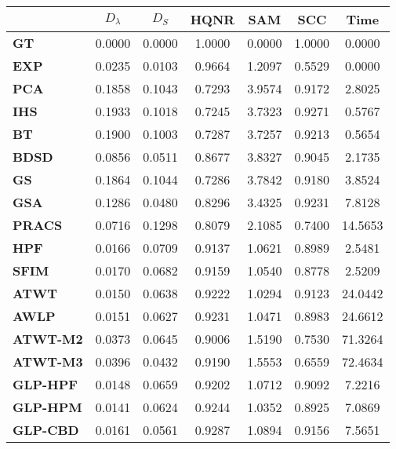 \begin{tabular}{|l|c|c|c|c|c|c|}
\hline
&\textbf{$D_{\lambda}$}&\textbf{$D_{S}$}&\textbf{HQNR}&\textbf{SAM}&\textbf{SCC}&\textbf{Time}\\\hline
\textbf{GT}&0.0000&0.0000&1.0000&0.0000&1.0000&0.0000\\\hline
\textbf{EXP}&0.0235&0.0103&0.9664&1.2097&0.5529&0.0000\\\hline
\textbf{PCA}&0.1858&0.1043&0.7293&3.9574&0.9172&2.8025\\\hline
\textbf{IHS}&0.1933&0.1018&0.7245&3.7323&0.9271&0.5767\\\hline
\textbf{BT}&0.1900&0.1003&0.7287&3.7257&0.9213&0.5654\\\hline
\textbf{BDSD}&0.0856&0.0511&0.8677&3.8327&0.9045&2.1735\\\hline
\textbf{GS}&0.1864&0.1044&0.7286&3.7842&0.9180&3.8524\\\hline
\textbf{GSA}&0.1286&0.0480&0.8296&3.4325&0.9231&7.8128\\\hline
\textbf{PRACS}&0.0716&0.1298&0.8079&2.1085&0.7400&14.5653\\\hline
\textbf{HPF}&0.0166&0.0709&0.9137&1.0621&0.8989&2.5481\\\hline
\textbf{SFIM}&0.0170&0.0682&0.9159&1.0540&0.8778&2.5209\\\hline
\textbf{ATWT}&0.0150&0.0638&0.9222&1.0294&0.9123&24.0442\\\hline
\textbf{AWLP}&0.0151&0.0627&0.9231&1.0471&0.8983&24.6612\\\hline
\textbf{ATWT-M2}&0.0373&0.0645&0.9006&1.5190&0.7530&71.3264\\\hline
\textbf{ATWT-M3}&0.0396&0.0432&0.9190&1.5553&0.6559&72.4634\\\hline
\textbf{GLP-HPF}&0.0148&0.0659&0.9202&1.0712&0.9092&7.2216\\\hline
\textbf{GLP-HPM}&0.0141&0.0624&0.9244&1.0352&0.8925&7.0869\\\hline
\textbf{GLP-CBD}&0.0161&0.0561&0.9287&1.0894&0.9156&7.5651\\\hline
\end{tabular}
